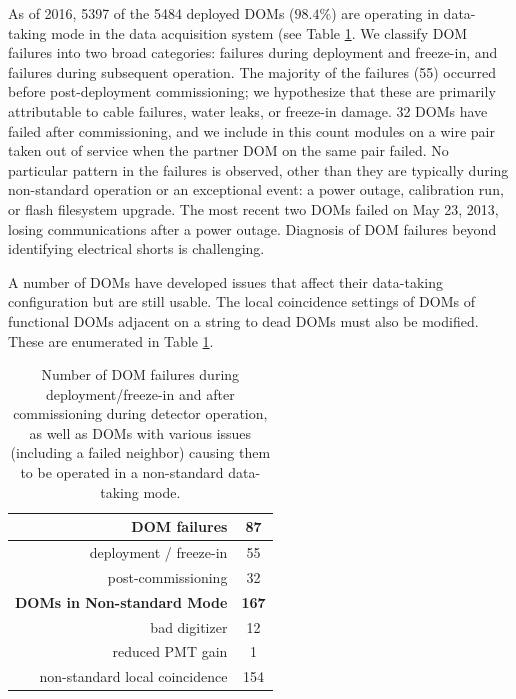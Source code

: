 As of 2016, 5397 of the 5484 deployed DOMs ($98.4\%$) are operating in
data-taking mode in the data acquisition system (see Table
\ref{tab:dom_failures}.  We classify DOM 
failures into two broad categories: failures during deployment and
freeze-in, and failures during subsequent operation.  The majority of the
failures (55) occurred before post-deployment commissioning; we hypothesize
that these are primarily attributable to cable failures, water leaks,
or freeze-in damage.  32 DOMs have failed after commissioning, and
we include in this count modules on a wire pair taken out of service when
the partner DOM on the same pair failed.  No particular pattern in the
failures is observed, other than they are typically during non-standard
operation or an exceptional event: a power outage, calibration run, or
flash filesystem upgrade.  The most recent two DOMs failed on May 23, 2013,
losing communications after a power outage.  Diagnosis of DOM failures
beyond identifying electrical shorts is challenging.

A number of DOMs have developed issues that affect their data-taking
configuration but are still usable.  The local coincidence settings of DOMs of
functional DOMs adjacent on a string to dead DOMs must also be
modified. These are enumerated in Table \ref{tab:dom_failures}.  

\begin{table}[h]
  \centering
  \begin{tabular}{| r | c |}
    \hline
    \bf{DOM failures} & \bf{87} \\
    \hline    
    deployment / freeze-in & 55 \\
    post-commissioning & 32 \\
    \hline
    \hline
    \bf{DOMs in Non-standard Mode} & \bf{167} \\
    \hline
    bad digitizer & 12 \\
    reduced PMT gain & 1 \\
    non-standard local coincidence & 154 \\
    \hline    
  \end{tabular}
  \caption{Number of DOM failures during deployment/freeze-in and after
    commissioning during detector operation, as well as DOMs with various
    issues (including a failed neighbor) causing them to be operated in a
    non-standard data-taking mode.} 
  \label{tab:dom_failures}
\end{table}

